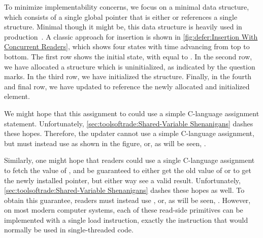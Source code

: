 To minimize implementability concerns, we focus on a minimal
data structure, which consists of a single global pointer that is either
 or references a single structure.
Minimal though it might be, this data structure is heavily used in
production~\cite{GeoffRomer2018C++DeferredReclamationP0561R4}.
A classic approach for insertion is shown in
\cref{fig:defer:Insertion With Concurrent Readers},
which shows four states with time advancing from top to bottom.
The first row shows the initial state, with  equal to .
In the second row, we have allocated a structure which is uninitialized,
as indicated by the question marks.
In the third row, we have initialized the structure.
Finally, in the fourth and final row, we have updated  to
reference the newly allocated and initialized element.

We might hope that this assignment to  could use a simple
C-language assignment statement.
Unfortunately,
\cref{sec:toolsoftrade:Shared-Variable Shenanigans}
dashes these hopes.
Therefore, the updater cannot use a simple C-language assignment, but
must instead use  as shown in the figure,
or, as will be seen, .

Similarly, one might hope that readers could use a single C-language
assignment to fetch the value of , and be guaranteed to either
get the old value of  or to get the newly installed pointer,
but either way see a valid result.
Unfortunately, \cref{sec:toolsoftrade:Shared-Variable Shenanigans}
dashes these hopes as well.
To obtain this guarantee, readers must instead use ,
or, as will be seen, .
However, on most modern computer systems, each of these read-side primitives
can be implemented with a single load instruction, exactly the instruction
that would normally be used in single-threaded code.

